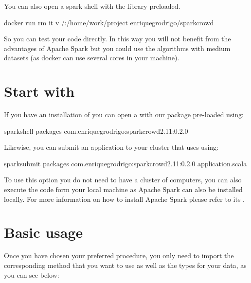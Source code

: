 \documentclass[letterpaper,10pt,english]{sphinxmanual}
\begin{document}
You can also open a spark shell with the library preloaded.

%
\begin{sphinxVerbatim}[commandchars=\\\{\}]
docker run \PYGZhy{}\PYGZhy{}rm \PYGZhy{}it \PYGZhy{}v /:/home/work/project enriquegrodrigo/spark\PYGZhy{}crowd
\end{sphinxVerbatim}

So you can test your code directly. In this way you will not benefit from the advantages of Apache Spark
but you could use the algorithms with medium datasets (as docker can use several cores in your machine).


\section{Start with }
\label{\detokenize{usage/quickstart:start-with-spark-packages}}
If you have an installation of   you can open a  with
our package pre-loaded using:

%
\begin{sphinxVerbatim}[commandchars=\\\{\}]
spark\PYGZhy{}shell \PYGZhy{}\PYGZhy{}packages com.enriquegrodrigo:spark\PYGZhy{}crowd\PYGZus{}2.11:0.2.0
\end{sphinxVerbatim}

Likewise, you can submit an application to your cluster that uses  using:

%
\begin{sphinxVerbatim}[commandchars=\\\{\}]
spark\PYGZhy{}submit \PYGZhy{}\PYGZhy{}packages com.enriquegrodrigo:spark\PYGZhy{}crowd\PYGZus{}2.11:0.2.0 application.scala
\end{sphinxVerbatim}

To use this option you do not need to have a cluster of computers, you can also execute the code form
your local machine as Apache Spark can also be installed locally. For more information on how to install
Apache Spark please refer to its .


\section{Basic usage}
\label{\detokenize{usage/quickstart:basic-usage}}
Once you have chosen your preferred procedure, you only need to import the corresponding method
that you want to use as well as the types for your data, as you can see below:
\end{document}
